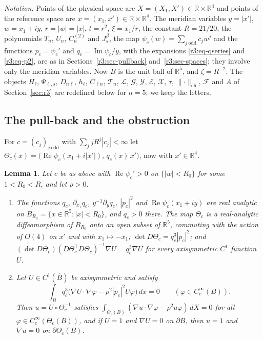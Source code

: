 \documentclass[11pt]{amsart}
\newtheorem{lemma}[theorem]{Lemma}
\theoremstyle{definition}
\theoremstyle{remark}
\numberwithin{equation}{section}
\newcommand{\R}{\mathbb{R}}
\newcommand{\Gc}{\mathcal{G}}
\newcommand{\Fc}{\mathcal{F}}
\DeclareMathOperator{\re}{Re}
\DeclareMathOperator{\im}{Im}
\newcommand{\nrm}[1]{\lVert #1\rVert}
\begin{document}
\emph{Notation.} Points of the physical space are $X=(X_1,X')\in\R\times\R^4$ and points of the reference space are $x=(x_1,x')\in\R\times\R^4$. The meridian variables $y=|x'|$, $w=x_1+iy$, $r=|w|=|x|$, $t=r^2$, $\xi=x_1/r$, the constant $R=21/20$, the polynomials $T_n$, $U_n$, $C^{(2)}_n$ and $J^\beta_s$, the map $\psi_c(w)=\sum_{j\ \mathrm{odd}}c_jw^j$ and the functions $p_c=\psi_c'$ and $q_c=\im\psi_c/y$, with the expansions \eqref{r3:eq-qseries} and \eqref{r3:eq-p2}, are as in Sections~\ref{r3:sec-pullback} and~\ref{r3:sec-spaces}; they involve only the meridian variables. Now $B$ is the unit ball of $\R^5$, and $\zeta=R^{-2}$. The objects $H_\ell$, $\Psi_{\ell,s}$, $D_{n\ell}$, $h_\ell$, $C_{\ell n}$, $\mathcal T_n$, $\mathcal L$, $\Gc$, $\mathcal Y$, $\mathcal E$, $\mathcal X$, $\tau$, $\nrm\cdot_{\mathrm{ch}}$, $\Fc$ and $A$ of Section~\ref{sec:r3} are redefined below for $n=5$; we keep the letters.

\subsection{The pull-back and the obstruction}\label{r5:sec-pullback}

For $c=(c_j)_{j\ \mathrm{odd}}$ with $\sum_jjR^j|c_j|<\infty$ let $\Theta_c(x)=\big(\re\psi_c(x_1+i|x'|),\,q_c(x)\,x'\big)$, now with $x'\in\R^4$.

\begin{lemma}\label{r5:lem-lift}
Let $c$ be as above with $\re\psi_c'>0$ on $\{|w|<R_0\}$ for some $1<R_0<R$, and let $\rho>0$.
\begin{enumerate}[label=\textup{(\alph*)}]
\item The functions $q_c$, $\partial_{x_1}q_c$, $y^{-1}\partial_yq_c$, $|p_c|^2$ and $\re\psi_c(x_1+iy)$ are real analytic on $B_{R_0}=\{x\in\R^5:|x|<R_0\}$, and $q_c>0$ there. The map $\Theta_c$ is a real-analytic diffeomorphism of $B_{R_0}$ onto an open subset of $\R^5$, commuting with the action of $O(4)$ on $x'$ and with $x_1\mapsto-x_1$; $\det D\Theta_c=q_c^3|p_c|^2$; and $(\det D\Theta_c)(D\Theta_c^{\mathsf T}D\Theta_c)^{-1}\nabla U=q_c^3\nabla U$ for every axisymmetric $C^1$ function $U$.
\item Let $U\in C^1(\overline B)$ be axisymmetric and satisfy
\begin{equation}\label{r5:eq-weak}
\int_Bq_c^3\big(\nabla U\cdot\nabla\varphi-\rho^2|p_c|^2U\varphi\big)\,dx=0\qquad(\varphi\in C^\infty_c(B)).
\end{equation}
Then $u=U\circ\Theta_c^{-1}$ satisfies $\int_{\Theta_c(B)}(\nabla u\cdot\nabla\varphi-\rho^2u\varphi)\,dX=0$ for all $\varphi\in C^\infty_c(\Theta_c(B))$, and if $U=1$ and $\nabla U=0$ on $\partial B$, then $u=1$ and $\nabla u=0$ on $\partial\Theta_c(B)$.
\end{enumerate}
\end{lemma}
\end{document}
